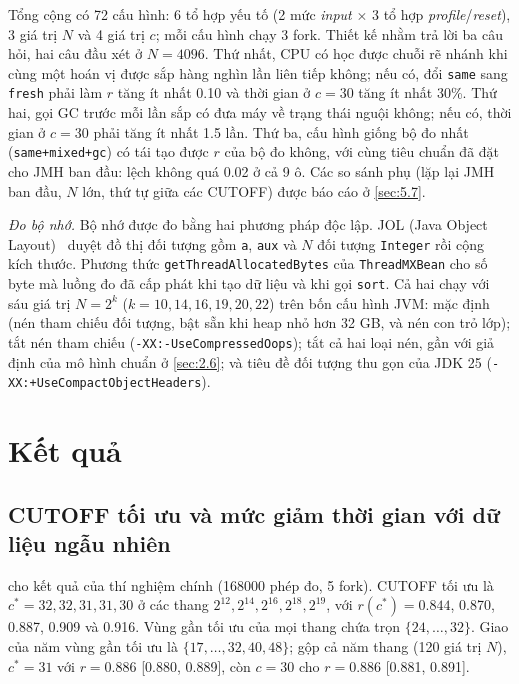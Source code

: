 \documentclass[12pt,a4paper]{article}
\begin{document}
Tổng cộng có 72 cấu hình: 6 tổ hợp yếu tố (2 mức \emph{input} $\times$ 3 tổ hợp \emph{profile}/\emph{reset}), 3 giá trị $N$ và 4 giá trị $c$; mỗi cấu hình chạy 3 fork. Thiết kế nhằm trả lời ba câu hỏi, hai câu đầu xét ở $N = 4096$. Thứ nhất, CPU có học được chuỗi rẽ nhánh khi cùng một hoán vị được sắp hàng nghìn lần liên tiếp không; nếu có, đổi \texttt{same} sang \texttt{fresh} phải làm $r$ tăng ít nhất 0.10 và thời gian ở $c = 30$ tăng ít nhất 30\%. Thứ hai, gọi GC trước mỗi lần sắp có đưa máy về trạng thái nguội không; nếu có, thời gian ở $c = 30$ phải tăng ít nhất 1.5 lần. Thứ ba, cấu hình giống bộ đo nhất (\texttt{same+mixed+gc}) có tái tạo được $r$ của bộ đo không, với cùng tiêu chuẩn đã đặt cho JMH ban đầu: lệch không quá 0.02 ở cả 9 ô. Các so sánh phụ (lặp lại JMH ban đầu, $N$ lớn, thứ tự giữa các CUTOFF) được báo cáo ở \cref{sec:5.7}.

\emph{Đo bộ nhớ.} Bộ nhớ được đo bằng hai phương pháp độc lập. JOL (Java Object Layout)~\citep{jol} duyệt đồ thị đối tượng gồm \texttt{a}, \texttt{aux} và $N$ đối tượng \texttt{Integer} rồi cộng kích thước. Phương thức \texttt{getThreadAllocatedBytes} của \texttt{ThreadMXBean} cho số byte mà luồng đo đã cấp phát khi tạo dữ liệu và khi gọi \texttt{sort}. Cả hai chạy với sáu giá trị $N = 2^k$ ($k = 10, 14, 16, 19, 20, 22$) trên bốn cấu hình JVM: mặc định (nén tham chiếu đối tượng, bật sẵn khi heap nhỏ hơn 32 GB, và nén con trỏ lớp); tắt nén tham chiếu (\texttt{-XX:-UseCompressedOops}); tắt cả hai loại nén, gần với giả định của mô hình chuẩn ở \cref{sec:2.6}; và tiêu đề đối tượng thu gọn của JDK 25 (\texttt{-XX:+UseCompactObjectHeaders}).

\section{Kết quả}\label{sec:5}
\subsection{CUTOFF tối ưu và mức giảm thời gian với dữ liệu ngẫu nhiên}\label{sec:5.1}\label{sec:5.2}
 cho kết quả của thí nghiệm chính (\num{168000} phép đo, 5 fork). CUTOFF tối ưu là $c^* = 32, 32, 31, 31, 30$ ở các thang $2^{12}, 2^{14}, 2^{16}, 2^{18}, 2^{19}$, với $r(c^*) = 0.844$, 0.870, 0.887, 0.909 và 0.916. Vùng gần tối ưu của mọi thang chứa trọn $\{24, \dots, 32\}$. Giao của năm vùng gần tối ưu là $\{17, \dots, 32, 40, 48\}$; gộp cả năm thang (120 giá trị $N$), $c^* = 31$ với $r = 0.886$ [0.880, 0.889], còn $c = 30$ cho $r = 0.886$ [0.881, 0.891].
\end{document}
